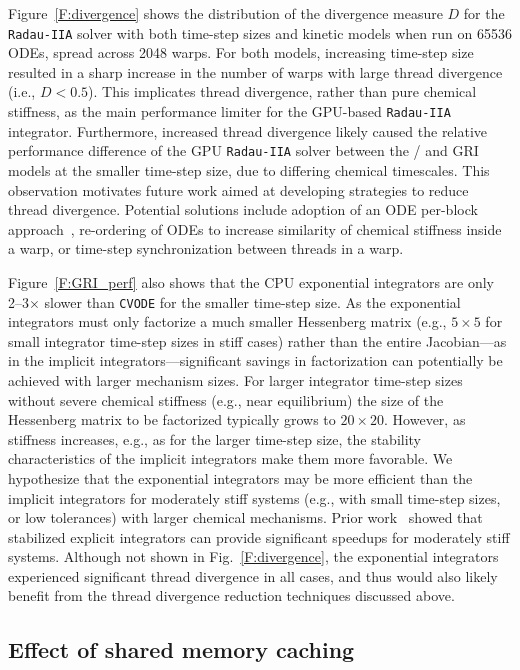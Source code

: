 \documentclass[preprint]{elsarticle}
\begin{document}
Figure~\ref{F:divergence} shows the distribution of the divergence measure $D$ for the \texttt{Radau-IIA} solver with both time-step sizes and kinetic models when run on \num{65536} ODEs, spread across \num{2048} warps.
For both models, increasing time-step size resulted in a sharp increase in the number of warps with large thread divergence (i.e., $D < 0.5$).
This implicates thread divergence, rather than pure chemical stiffness, as the main performance limiter for the GPU-based \texttt{Radau-IIA} integrator.
Furthermore, increased thread divergence likely caused the relative performance difference of the GPU \texttt{Radau-IIA} solver between the \slash{} and GRI models at the smaller time-step size, due to differing chemical timescales.
This observation motivates future work aimed at developing strategies to reduce thread divergence.
Potential solutions include adoption of an ODE per-block approach~\cite{Stone:2013aa}, re-ordering of ODEs to increase similarity of chemical stiffness inside a warp, or time-step synchronization between threads in a warp.

Figure~\ref{F:GRI_perf} also shows that the CPU exponential integrators are only \numrange{2}{3}$\times$ slower than \texttt{CVODE} for the smaller time-step size.
As the exponential integrators must only factorize a much smaller Hessenberg matrix (e.g., $5\times 5$ for small integrator time-step sizes in stiff cases) rather than the entire Jacobian---as in the implicit integrators---significant savings in factorization can potentially be achieved with larger mechanism sizes.
For larger integrator time-step sizes without severe chemical stiffness (e.g., near equilibrium) the size of the Hessenberg matrix to be factorized typically grows to $20\times 20$.
However, as stiffness increases, e.g., as for the larger time-step size, the stability characteristics of the implicit integrators make them more favorable.
We hypothesize that the exponential integrators may be more efficient than the implicit integrators for moderately stiff systems (e.g., with small time-step sizes, or low tolerances) with larger chemical mechanisms.
Prior work~\cite{Niemeyer:2014aa} showed that stabilized explicit integrators can provide significant speedups for moderately stiff systems.
Although not shown in Fig.~\ref{F:divergence}, the exponential integrators experienced significant thread divergence in all cases, and thus would also likely benefit from the thread divergence reduction techniques discussed above.

\subsection{Effect of shared memory caching}
\label{S:smem}
\end{document}
